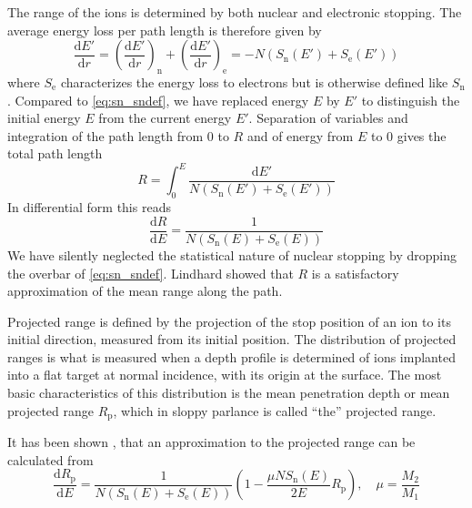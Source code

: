 The range of the ions is determined by both nuclear and electronic stopping. The average energy loss per path length is therefore given by
%
\begin{equation}
    \frac{ \mathrm{d} E' }{ \mathrm{d} r } =
        \left( \frac{ \mathrm{d} E' }{ \mathrm{d} r } \right)_\mathrm{n} +
        \left( \frac{ \mathrm{d} E' }{ \mathrm{d} r } \right)_\mathrm{e} =
        - N (S_\mathrm{n}(E') + S_\mathrm{e}(E'))
\end{equation}
%
where $S_\mathrm{e}$ characterizes the energy loss to electrons but is otherwise defined like $S_\mathrm{n}$. Compared to \cref{eq:sn_sndef}, we have replaced energy $E$ by $E'$ to distinguish the initial energy $E$ from the current energy $E'$. Separation of variables and integration of the path length from $0$ to $R$ and of energy from $E$ to $0$ gives the total path length
%
\begin{equation}
    \label{eq:sn_range}
    R = \int_0^E \frac{ \mathrm{d} E' }{ N (S_\mathrm{n}(E') + S_\mathrm{e}(E'))}
\end{equation}
%
In differential form this reads
%
\begin{equation}
    \label{eq:sn_range_differential}
    \frac{ \mathrm{d} R }{ \mathrm{d} E } =
        \frac{ 1 }{ N (S_\mathrm{n}(E) + S_\mathrm{e}(E))}
\end{equation}
%
We have silently neglected the statistical nature of nuclear stopping by dropping the overbar of \cref{eq:sn_sndef}. Lindhard \cite{Lin63} showed that $R$ is a satisfactory approximation of the mean range along the path.

Projected range is defined by the projection of the stop position of an ion to its initial direction, measured from its initial position. The distribution of projected ranges is what is measured when a depth profile is determined of ions implanted into a flat target at normal incidence, with its origin at the surface. The most basic characteristics of this distribution is the mean penetration depth or mean projected range $R_\mathrm{p}$, which in sloppy parlance is called ``the'' projected range.

It has been shown \cite{Bie82,Ash91}, that an approximation to the projected range can be calculated from
%
\begin{equation}
    \label{eq:sn_rp_differential}
    \frac{ \mathrm{d} R_\mathrm{p} }{ \mathrm{d} E } =
        \frac{ 1 }{ N (S_\mathrm{n}(E) + S_\mathrm{e}(E))}
        \left( 1 - \frac{ \mu N S_\mathrm{n}(E) }{ 2 E } R_\mathrm{p} \right),
        \quad \mu = \frac{ M_2 }{ M_1 }
\end{equation}

